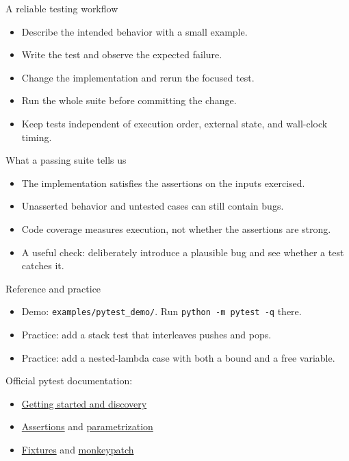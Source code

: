 \documentclass[aspectratio=169,11pt]{beamer}
\newcommand{\code}[1]{\texttt{#1}}
\begin{document}
\begin{frame}[fragile]{A reliable testing workflow}
\begin{itemize}
\item Describe the intended behavior with a small example.
\item Write the test and observe the expected failure.
\item Change the implementation and rerun the focused test.
\item Run the whole suite before committing the change.
\item Keep tests independent of execution order, external state, and wall-clock timing.
\end{itemize}
\end{frame}

\begin{frame}[fragile]{What a passing suite tells us}
\begin{itemize}
\item The implementation satisfies the assertions on the inputs exercised.
\item Unasserted behavior and untested cases can still contain bugs.
\item Code coverage measures execution, not whether the assertions are strong.
\item A useful check: deliberately introduce a plausible bug and see whether a test catches it.
\end{itemize}
\end{frame}

\begin{frame}[fragile]{Reference and practice}
\begin{itemize}
\item Demo: \code{examples/pytest\_demo/}. Run \code{python -m pytest -q} there.
\item Practice: add a stack test that interleaves pushes and pops.
\item Practice: add a nested-lambda case with both a bound and a free variable.
\end{itemize}\medskip
Official pytest documentation:
\begin{itemize}
\item \href{https://docs.pytest.org/en/stable/getting-started.html}{Getting started and discovery}
\item \href{https://docs.pytest.org/en/stable/how-to/assert.html}{Assertions} and \href{https://docs.pytest.org/en/stable/how-to/parametrize.html}{parametrization}
\item \href{https://docs.pytest.org/en/stable/how-to/fixtures.html}{Fixtures} and \href{https://docs.pytest.org/en/stable/how-to/monkeypatch.html}{monkeypatch}
\end{itemize}
\end{frame}
\end{document}
